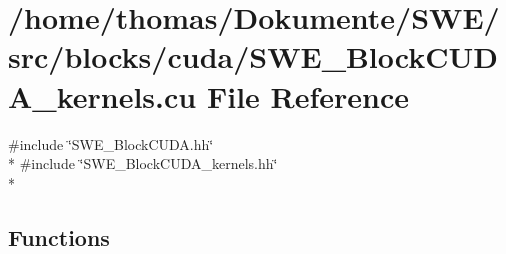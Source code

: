\hypertarget{SWE__BlockCUDA__kernels_8cu}{\section{/home/thomas/\-Dokumente/\-S\-W\-E/src/blocks/cuda/\-S\-W\-E\-\_\-\-Block\-C\-U\-D\-A\-\_\-kernels.cu File Reference}
\label{SWE__BlockCUDA__kernels_8cu}
}
{\ttfamily \#include \char`\"{}S\-W\-E\-\_\-\-Block\-C\-U\-D\-A.\-hh\char`\"{}}\\*
{\ttfamily \#include \char`\"{}S\-W\-E\-\_\-\-Block\-C\-U\-D\-A\-\_\-kernels.\-hh\char`\"{}}\\*
\subsection*{Functions}
